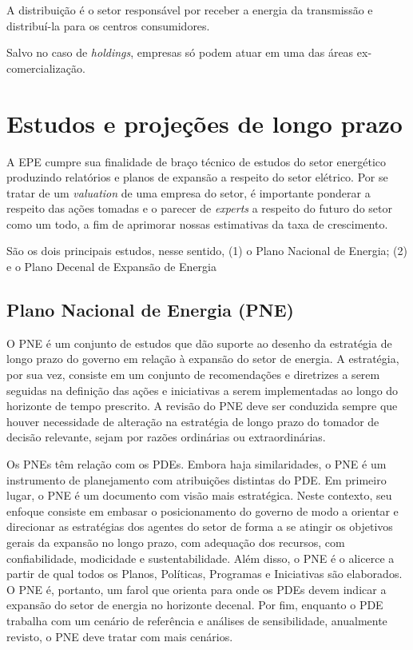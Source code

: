 \documentclass[grad,numbers]{coppe}
\begin{document}
  A distribuição é o setor responsável por receber a energia da transmissão e distribuí-la para os centros consumidores.
  
  Salvo no caso de \emph{holdings}, empresas só podem atuar em uma das áreas ex-comercialização.
  
  \hypertarget{estudos-e-projeuxe7uxf5es-de-longo-prazo}{%
  \section{Estudos e projeções de longo prazo}\label{estudos-e-projeuxe7uxf5es-de-longo-prazo}}
  
  A EPE cumpre sua finalidade de braço técnico de estudos do setor energético produzindo relatórios e planos de expansão a respeito do setor elétrico. Por se tratar de um \emph{valuation} de uma empresa do setor, é importante ponderar a respeito das ações tomadas e o parecer de \emph{experts} a respeito do futuro do setor como um todo, a fim de aprimorar nossas estimativas da taxa de crescimento.
  
  São os dois principais estudos, nesse sentido, (1) o Plano Nacional de Energia; (2) e o Plano Decenal de Expansão de Energia
  
  \hypertarget{plano-nacional-de-energia-pne}{%
  \subsection{Plano Nacional de Energia (PNE)}\label{plano-nacional-de-energia-pne}}
  
  O PNE é um conjunto de estudos que dão suporte ao desenho da estratégia de longo prazo do governo em relação à expansão do setor de energia. A estratégia, por sua vez, consiste em um conjunto de recomendações e diretrizes a serem seguidas na definição das ações e iniciativas a serem implementadas ao longo do horizonte de tempo prescrito. A revisão do PNE deve ser conduzida sempre que houver necessidade de alteração na estratégia de longo prazo do tomador de decisão relevante, sejam por razões ordinárias ou extraordinárias.
  
  Os PNEs têm relação com os PDEs. Embora haja similaridades, o PNE é um instrumento de planejamento com atribuições distintas do PDE. Em primeiro lugar, o PNE é um documento com visão mais estratégica. Neste contexto, seu enfoque consiste em embasar o posicionamento do governo de modo a orientar e direcionar as estratégias dos agentes do setor de forma a se atingir os objetivos gerais da expansão no longo prazo, com adequação dos recursos, com confiabilidade, modicidade e sustentabilidade. Além disso, o PNE é o alicerce a partir de qual todos os Planos, Políticas, Programas e Iniciativas são elaborados. O PNE é, portanto, um farol que orienta para onde os PDEs devem indicar a expansão do setor de energia no horizonte decenal. Por fim, enquanto o PDE trabalha com um cenário de referência e análises de sensibilidade, anualmente revisto, o PNE deve tratar com mais cenários.
  
\end{document}
